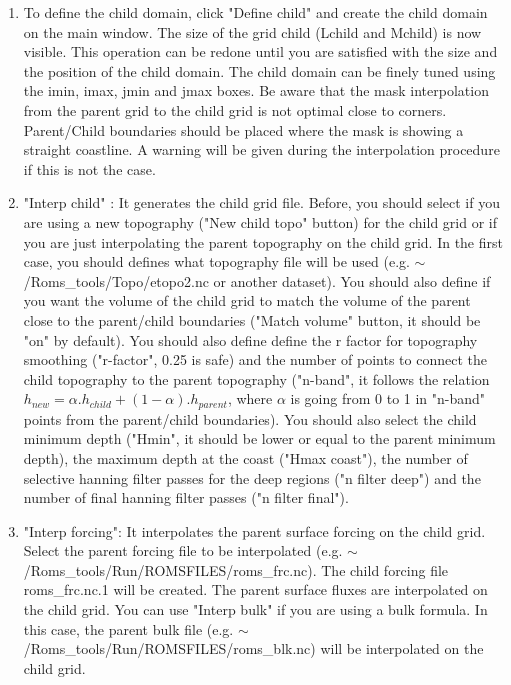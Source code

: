 \begin{enumerate}

\item To define the child domain, click "Define child" and create
the child domain on the main window. The size of the grid child
(Lchild and Mchild) is now visible. This operation can be redone 
until you are satisfied with the size and the position of the child 
domain. The child domain can be finely tuned using the imin, 
imax, jmin and jmax boxes. 
Be aware that the mask interpolation from the parent grid
to the child grid is not optimal close to corners. Parent/Child
boundaries should be placed where the mask is showing a straight
coastline. A warning will be given during the interpolation
procedure if this is not the case.

\item "Interp child" : It generates the child grid file. Before, 
you should select if you are using a new topography
("New child topo" button) for the child
grid or if you are just interpolating the parent topography
on the child grid. In the first case, you should defines
what topography file will be used (e.g. 
$\sim$/Roms\_tools/Topo/etopo2.nc or another dataset).
You should also define if you want the volume of the child grid 
to match the volume of the parent close to the parent/child 
boundaries ("Match volume" button, it should be "on" by default).
You should also define define the r factor \citep{Bec93} 
for topography smoothing ("r-factor", 0.25 is safe) and
the number of points to connect the child topography to the
parent topography ("n-band", it follows the relation 
$h_{new}=\alpha.h_{child} + (1-\alpha).h_{parent}$, 
where $\alpha$ is going from 0 to 1 in "n-band" points 
from the parent/child boundaries).
You should also select the child minimum depth ("Hmin",
it should be lower or equal to the parent minimum depth),
the maximum depth at the coast ("Hmax coast"), the 
number of selective hanning filter passes for the deep 
regions ("n filter deep") and the number of final 
hanning filter passes ("n filter final").

\item "Interp forcing": It interpolates the parent 
surface forcing  on the child grid. Select the parent forcing file
to be interpolated (e.g. $\sim$/Roms\_tools/Run/ROMSFILES/roms\_frc.nc). 
The child forcing file roms\_frc.nc.1 will be created. 
The parent surface fluxes are interpolated on the child grid. 
You can use "Interp bulk" if you are using a bulk formula.
In this case, the parent bulk file 
(e.g. $\sim$/Roms\_tools/Run/ROMSFILES/roms\_blk.nc) will be
interpolated on the child grid.


\end{enumerate}
